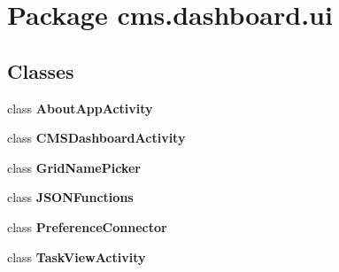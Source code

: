 \section{\-Package cms.\-dashboard.\-ui}
\label{namespacecms_1_1dashboard_1_1ui}
\subsection*{\-Classes}
\begin{DoxyCompactItemize}
\item 
class {\bf \-About\-App\-Activity}
\item 
class {\bf \-C\-M\-S\-Dashboard\-Activity}
\item 
class {\bf \-Grid\-Name\-Picker}
\item 
class {\bf \-J\-S\-O\-N\-Functions}
\item 
class {\bf \-Preference\-Connector}
\item 
class {\bf \-Task\-View\-Activity}
\end{DoxyCompactItemize}
